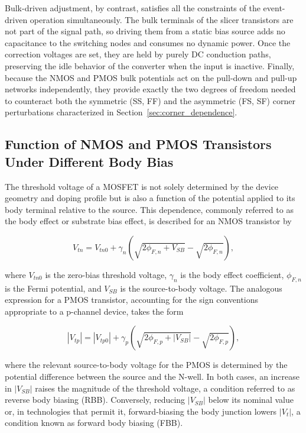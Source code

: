 Bulk-driven adjustment, by contrast, satisfies all the constraints of the
event-driven operation simultaneously. The bulk terminals of the slicer
transistors are not part of the signal path, so driving them from a static
bias source adds no capacitance to the switching nodes and consumes no dynamic
power. Once the correction voltages are set, they are held by purely DC
conduction paths, preserving the idle behavior of the converter when the
input is inactive. Finally, because the NMOS and PMOS bulk potentials act on
the pull-down and pull-up networks independently, they provide exactly the two
degrees of freedom needed to counteract both the symmetric (SS, FF) and the
asymmetric (FS, SF) corner perturbations characterized in
Section~\ref{sec:corner_dependence}.

\subsection{Function of NMOS and PMOS Transistors Under Different Body Bias}

The threshold voltage of a MOSFET is not solely determined by the device
geometry and doping profile but is also a function of the potential applied
to its body terminal relative to the source. This dependence, commonly referred
to as the body effect or substrate bias effect, is described for an NMOS
transistor by

\begin{equation}
    V_{tn} = V_{tn0} + \gamma_n
    \left( \sqrt{2\phi_{F,n} + V_{SB}} - \sqrt{2\phi_{F,n}} \right),
    \label{eq:body_effect_nmos}
\end{equation}

\noindent
where $V_{tn0}$ is the zero-bias threshold voltage, $\gamma_n$ is the body
effect coefficient, $\phi_{F,n}$ is the Fermi potential, and $V_{SB}$ is the
source-to-body voltage. The analogous expression for a PMOS transistor,
accounting for the sign conventions appropriate to a p-channel device,
takes the form

\begin{equation}
    |V_{tp}| = |V_{tp0}| + \gamma_p
    \left( \sqrt{2\phi_{F,p} + |V_{SB}|} - \sqrt{2\phi_{F,p}} \right),
    \label{eq:body_effect_pmos}
\end{equation}

\noindent
where the relevant source-to-body voltage for the PMOS is determined by the
potential difference between the source and the N-well. In both cases, an
increase in $|V_{SB}|$ raises the magnitude of the threshold voltage, a
condition referred to as reverse body biasing (RBB). Conversely, reducing
$|V_{SB}|$ below its nominal value or, in technologies that permit it,
forward-biasing the body junction lowers $|V_t|$, a condition known as
forward body biasing (FBB).

